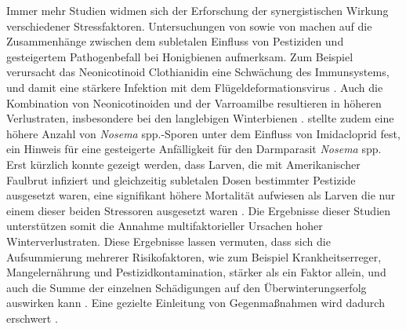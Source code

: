 \newline
Immer mehr Studien widmen sich der Erforschung der synergistischen Wirkung verschiedener Stressfaktoren. Untersuchungen von \cite{pettis2012, diprisco2013} sowie von \cite{alburaki2017} machen auf die Zusammenhänge zwischen dem subletalen Einfluss von Pestiziden und gesteigertem Pathogenbefall bei Honigbienen aufmerksam. Zum Beispiel verursacht das Neonicotinoid Clothianidin eine Schwächung des Immunsystems, und damit eine stärkere Infektion mit dem Flügeldeformationsvirus \citep{diprisco2013}. Auch die Kombination von Neonicotinoiden und der Varroamilbe resultieren in höheren Verlustraten, insbesondere bei den langlebigen Winterbienen \citep{straub2019}. \cite{pettis2012} stellte zudem eine höhere Anzahl von \textit{Nosema} spp.-Sporen unter dem Einfluss von Imidacloprid fest, ein Hinweis für eine gesteigerte Anfälligkeit für den Darmparasit \textit{Nosema} spp. Erst kürzlich konnte gezeigt werden, dass Larven, die mit Amerikanischer Faulbrut infiziert und gleichzeitig subletalen Dosen bestimmter Pestizide ausgesetzt waren, eine signifikant höhere Mortalität aufwiesen als Larven die nur einem dieser beiden Stressoren ausgesetzt waren \citep{lopez2017}. Die Ergebnisse dieser Studien unterstützen somit die Annahme multifaktorieller Ursachen hoher Winterverlustraten. Diese Ergebnisse lassen vermuten, dass sich die Aufsummierung mehrerer Risikofaktoren, wie zum Beispiel Krankheitserreger, Mangelernährung und Pestizidkontamination, stärker als ein Faktor allein, und auch die Summe der einzelnen Schädigungen auf den Überwinterungserfolg auswirken kann \citep{goulson2015,barroso-arevalo2019}. Eine gezielte Einleitung von Gegenmaßnahmen wird dadurch erschwert \citep{brodschneider2013}.
\newline
